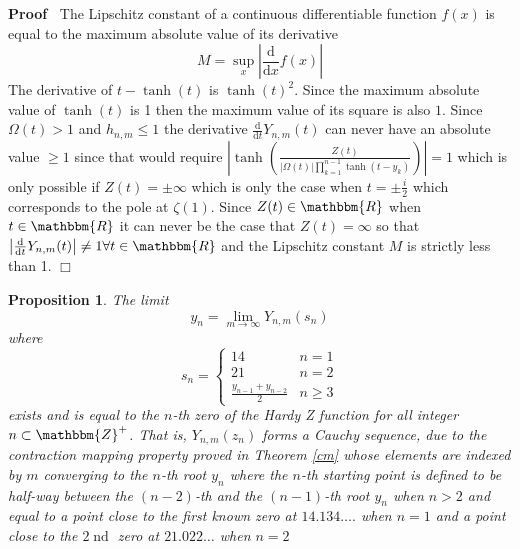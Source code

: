 \documentclass{article}
\newcommand{\mathd}{\mathrm{d}}
\newcommand{\tmop}[1]{\ensuremath{\operatorname{#1}}}
\newenvironment{proof}{\noindent\textbf{Proof\ }}{\hspace*{\fill}$\Box$\medskip}
\newtheorem{proposition}{Proposition}
{\theorembodyfont{\rmfamily}\newtheorem{remark}{Remark}}
\begin{document}
\begin{proof}
  The Lipschitz constant of a continuous differentiable function $f (x)$ is
  equal to the maximum absolute value of its derivative
  \begin{equation}
    M = \sup_x \left| \frac{\mathd}{\mathd x} f (x) \right|
  \end{equation}
  The derivative of $t - \tanh (t)$ is $\tanh (t)^2$. Since the maximum
  absolute value of $\tanh (t)$ is 1 then the maximum value of its square is
  also $1$. Since $\Omega (t) > 1$ and $h_{n, m} \leqslant 1$ the derivative
  $\frac{\mathd}{\mathd t} Y_{n, m} (t)$ can never have an absolute value
  $\geqslant 1$ since that would require $\left| \tanh \left( \frac{Z (t)}{|
  \Omega (t) | \prod_{k = 1}^{n - 1} \tanh (t - y_k)} \right) \right| = 1$
  which is only possible if $Z (t) = \pm \infty$ which is only the case when
  $t = \pm \frac{i}{2}$ which corresponds to the pole at $\zeta (1)$. Since $Z
  (t) \in \mathbbm{R}$ when $t \in \mathbbm{R}$ it can never be the case that
  $Z (t) = \infty$ so that $\left| \frac{\mathd}{\mathd t} Y_{n, m} (t)
  \right| \neq 1 \forall t \in \mathbbm{R}$ and the Lipschitz constant $M$ is
  strictly less than 1.
\end{proof}

\begin{proposition}
  \label{p1}The limit
  \begin{equation}
    y_n = \lim_{m \rightarrow \infty} Y_{n, m} (s_n)
  \end{equation}
  where
  \begin{equation}
    s_n = \left\{ \begin{array}{ll}
      14 & n = 1\\
      21 & n = 2\\
      \frac{y_{n - 1} + y_{n - 2}}{2} & n \geqslant 3
    \end{array} \right.
  \end{equation}
  exists and is equal to the $n$-th zero of the Hardy Z function for all
  integer $n \subset \mathbbm{Z}^+$. That is, $Y_{n, m} (z_n)$ forms a Cauchy
  sequence, due to the contraction mapping property proved in Theorem \ref{cm}
  whose elements are indexed by $m$ converging to the $n$-th root $y_n$ where
  the $n$-th starting point is defined to be half-way between the $(n - 2)$-th
  and the $(n - 1)$-th root $y_n$ when $n > 2$ and equal to a point close to
  the first known zero at $14.134 \ldots .$ when $n = 1$ and a point close to
  the $2 \tmop{nd}$ zero at $21.022 \ldots$ when $n = 2$
\end{proposition}
\end{document}
